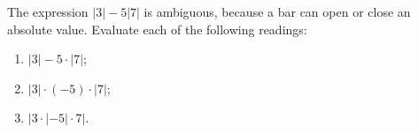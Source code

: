 The expression $|3|-5|7|$ is ambiguous, because a bar can open or close an absolute value. Evaluate each of the following readings:
\begin{enumerate}
\item[(a)] $|3|-5\cdot|7|$;
\item[(b)] $|3|\cdot(-5)\cdot|7|$;
\item[(c)] $\bigl|3\cdot|-5|\cdot7\bigr|$.
\end{enumerate}
